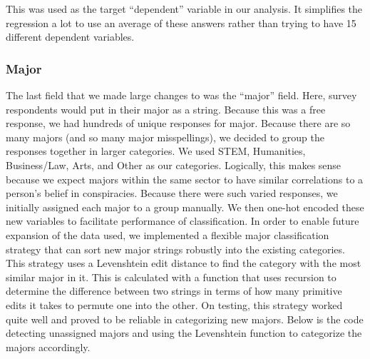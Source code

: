 \documentclass[11pt]{article}
\begin{document}
This was used as the target ``dependent'' variable in our analysis. It
simplifies the regression a lot to use an average of these answers
rather than trying to have 15 different dependent variables.

\hypertarget{major}{%
\subsubsection*{Major}\label{major}}

The last field that we made large changes to was the ``major'' field.
Here, survey respondents would put in their major as a string. Because
this was a free response, we had hundreds of unique responses for major.
Because there are so many majors (and so many major misspellings), we
decided to group the responses together in larger categories. We used
STEM, Humanities, Business/Law, Arts, and Other as our categories.
Logically, this makes sense because we expect majors within the same
sector to have similar correlations to a person's belief in
conspiracies. Because there were such varied responses, we initially
assigned each major to a group manually. We then one-hot encoded these
new variables to facilitate performance of classification. In order to
enable future expansion of the data used, we implemented a flexible
major classification strategy that can sort new major strings robustly
into the existing categories. This strategy uses a Levenshtein edit
distance to find the category with the most similar major in it. This is
calculated with a function that uses recursion to determine the
difference between two strings in terms of how many primitive edits it
takes to permute one into the other. On testing, this strategy worked
quite well and proved to be reliable in categorizing new majors. Below
is the code detecting unassigned majors and using the Levenshtein
function to categorize the majors accordingly.
\end{document}
